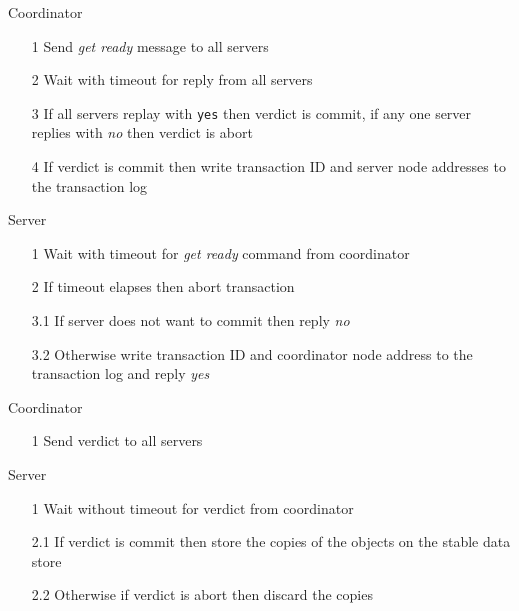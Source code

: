 \documentclass[a4paper]{article}
\begin{document}
\begin{minipage}[t]{0.5\textwidth}
  Coordinator

  \begin{enumerate}
    \item[1] Send \textit{get ready} message to all servers
    \item[2] Wait with timeout for reply from all servers
    \item[3] If all servers replay with \texttt{yes} then verdict is commit, if
             any one server replies with \textit{no} then verdict is abort
    \item[4] If verdict is commit then write transaction ID and server node
             addresses to the transaction log
  \end{enumerate}
\end{minipage}%
\begin{minipage}[t]{0.5\textwidth}
  Server

  \begin{enumerate}
    \item[1]   Wait with timeout for \textit{get ready} command from coordinator
    \item[2]   If timeout elapses then abort transaction
    \item[3.1] If server does not want to commit then reply \textit{no}
    \item[3.2] Otherwise write transaction ID and coordinator node address to
               the transaction log and reply \textit{yes}
  \end{enumerate}
\end{minipage}


\begin{minipage}[t]{0.5\textwidth}
  Coordinator

  \begin{enumerate}
    \item[1] Send verdict to all servers
  \end{enumerate}
\end{minipage}%
\begin{minipage}[t]{0.5\textwidth}
  Server

  \begin{enumerate}
    \item[1]   Wait without timeout for verdict from coordinator
    \item[2.1] If verdict is commit then store the copies of the objects on the
               stable data store
    \item[2.2] Otherwise if verdict is abort then discard the copies
  \end{enumerate}
\end{minipage}
\end{document}
